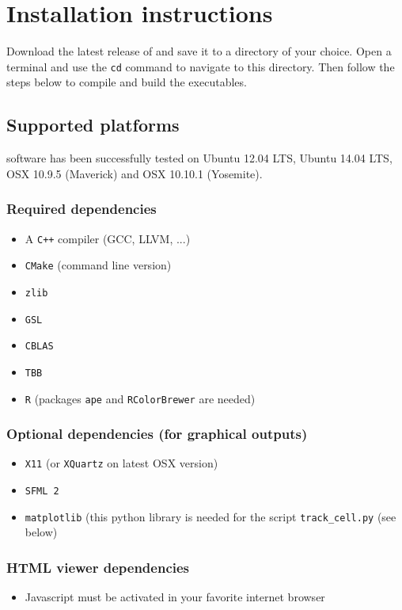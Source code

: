 \chapter{Installation instructions}

Download the latest release of {\packageName} and save it to a directory of your choice. Open a terminal and use the \texttt{cd} command to navigate to this directory. Then follow the steps below to compile and build the executables.

\section{Supported platforms}
{\packageName} software has been successfully tested on Ubuntu 12.04 LTS, Ubuntu 14.04 LTS, OSX 10.9.5 (Maverick) and OSX 10.10.1 (Yosemite).

\subsection{Required dependencies}
\begin{itemize}
	\item A \texttt{C++} compiler (GCC, LLVM, ...)
	\item \texttt{CMake} (command line version)
	\item \texttt{zlib}
	\item \texttt{GSL}
	\item \texttt{CBLAS}
	\item \texttt{TBB}
	\item \texttt{R} (packages \texttt{ape} and \texttt{RColorBrewer} are needed)
\end{itemize}

\subsection{Optional dependencies (for graphical outputs)}
\begin{itemize}
	\item \texttt{X11} (or \texttt{XQuartz} on latest OSX version)
	\item \texttt{SFML 2}
	\item \texttt{matplotlib} (this python library is needed for the script \texttt{track\_cell.py} (see below)
\end{itemize}

\subsection{HTML viewer dependencies}
\begin{itemize}
	\item Javascript must be activated in your favorite internet browser
\end{itemize}


